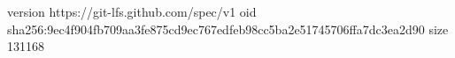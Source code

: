version https://git-lfs.github.com/spec/v1
oid sha256:9ec4f904fb709aa3fe875cd9ec767edfeb98cc5ba2e51745706ffa7dc3ea2d90
size 131168
